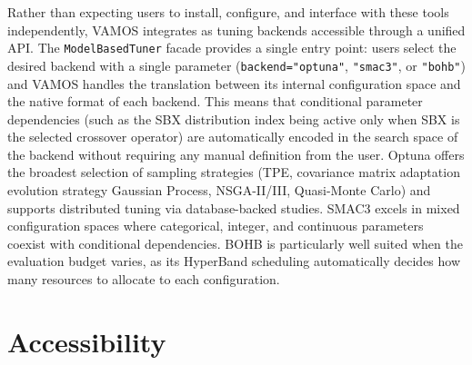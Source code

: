 \documentclass[final,5p,times,twocolumn]{elsarticle}
\newcommand{\VAMOS}{VAMOS}
\begin{document}
Rather than expecting users to install, configure, and interface with these tools independently, \VAMOS{} integrates  as tuning backends accessible through a unified API. The \texttt{ModelBasedTuner} facade provides a single entry point: users select the desired backend with a single parameter (\texttt{backend="optuna"}, \texttt{"smac3"}, or \texttt{"bohb"}) and \VAMOS{} handles the translation between its internal configuration space and the native format of each backend. This means that conditional parameter dependencies (such as the SBX distribution index being active only when SBX is the selected crossover operator) are automatically encoded in the search space of the backend without requiring any manual definition from the user. Optuna offers the broadest selection of sampling strategies (TPE, covariance matrix adaptation evolution strategy  Gaussian Process, NSGA-II/III, Quasi-Monte Carlo) and supports distributed tuning via database-backed studies. SMAC3 excels in mixed configuration spaces where categorical, integer, and continuous parameters coexist with conditional dependencies. BOHB is particularly well suited when the evaluation budget varies, as its HyperBand scheduling automatically decides how many resources to allocate to each configuration.



\section{Accessibility}
\label{sec:accessibility}
\end{document}
